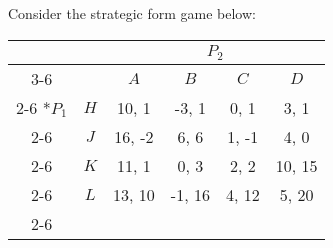 \question

Consider the strategic form game below:

\begin{table}[!h]
  \begin{center}
    \begin{tabular}{*{6}{c|}}
      \multicolumn{2}{c}{} & \multicolumn{4}{c}{$P_2$} \\ \cline{3-6}
      \multicolumn{1}{c}{} &  & $A$ & $B$ & $C$ & $D$ \\ \cline{2-6} 
      \multirow{4}*{$P_1$}
      & $H$ & 10,  1 & -3,  1 &  0,  1 &  3,  1 \\ \cline{2-6}
      & $J$ & 16, -2 &  6,  6 &  1, -1 &  4,  0 \\ \cline{2-6} 
      & $K$ & 11,  1 &  0,  3 &  2,  2 & 10, 15 \\ \cline{2-6} 
      & $L$ & 13, 10 & -1, 16 &  4, 12 &  5, 20 \\ \cline{2-6} 
  \end{tabular}
  \end{center}
\end{table}

